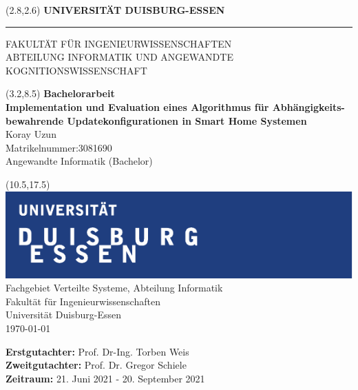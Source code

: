 \begin{titlepage}
\vspace*{-1cm}
\newlength{\links}
\setlength{\links}{0.9cm}
\setlength{\TPHorizModule}{1cm}
\setlength{\TPVertModule}{1cm}
\textblockorigin{0pt}{0pt}

\sffamily
\LARGE

\begin{textblock}{16.5}(2.8,2.6)
 \hspace*{-0.25cm} \textbf{UNIVERSITÄT DUISBURG-ESSEN} \\
 \hspace*{-1.15cm} \rule{5mm}{5mm} \hspace*{0.05cm} FAKULTÄT FÜR INGENIEURWISSENSCHAFTEN\\
 \large{}ABTEILUNG INFORMATIK UND ANGEWANDTE KOGNITIONSWISSENSCHAFT\\
\end{textblock}


\begin{textblock}{14.5}(3.2,8.5)
  \large
{ \textbf{Bachelorarbeit}} \\[1cm]
{\LARGE \Large\textbf{Implementation und Evaluation eines Algorithmus für Abhängigkeits-
bewahrende Updatekonfigurationen in Smart Home Systemen}} \\[1.3cm]
Koray Uzun\\
Matrikelnummer:3081690\\
Angewandte Informatik (Bachelor)
\end{textblock}



\begin{textblock}{10}(10.5,17.5)
\includegraphics[scale=1.0]{images/unilogo.pdf}\\
\normalsize
\raggedleft
Fachgebiet Verteilte Systeme, Abteilung Informatik \\
Fakultät für Ingenieurwissenschaften \\
Universität Duisburg-Essen \\[2ex]

\today\\[15ex]
\raggedright
{\textbf{Erstgutachter:}} Prof. Dr-Ing. Torben Weis \\
{\textbf{Zweitgutachter:}} Prof. Dr. Gregor Schiele \\
{\textbf{Zeitraum:}} 21. Juni 2021 - 20. September 2021 \\
\end{textblock}

\end{titlepage}
